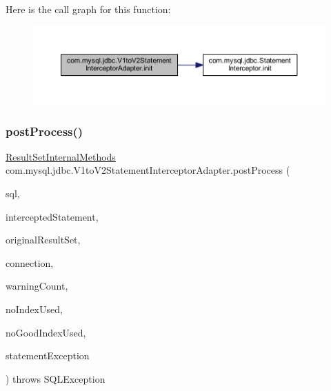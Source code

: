 Here is the call graph for this function\+:
\nopagebreak
\begin{figure}[H]
\begin{center}
\leavevmode
\includegraphics[width=350pt]{classcom_1_1mysql_1_1jdbc_1_1_v1to_v2_statement_interceptor_adapter_acf5784b9b687c7d58d92492e2bd6a800_cgraph}
\end{center}
\end{figure}
\mbox{\label{classcom_1_1mysql_1_1jdbc_1_1_v1to_v2_statement_interceptor_adapter_ab1a3f9ab0d2156eb2fbe442e39354ece}} 
\subsubsection{\texorpdfstring{post\+Process()}{postProcess()}}
{\footnotesize\ttfamily \mbox{\hyperlink{interfacecom_1_1mysql_1_1jdbc_1_1_result_set_internal_methods}{Result\+Set\+Internal\+Methods}} com.\+mysql.\+jdbc.\+V1to\+V2\+Statement\+Interceptor\+Adapter.\+post\+Process (\begin{DoxyParamCaption}\item[{String}]{sql,  }\item[{\mbox{\hyperlink{interfacecom_1_1mysql_1_1jdbc_1_1_statement}{Statement}}}]{intercepted\+Statement,  }\item[{\mbox{\hyperlink{interfacecom_1_1mysql_1_1jdbc_1_1_result_set_internal_methods}{Result\+Set\+Internal\+Methods}}}]{original\+Result\+Set,  }\item[{\mbox{\hyperlink{interfacecom_1_1mysql_1_1jdbc_1_1_connection}{Connection}}}]{connection,  }\item[{int}]{warning\+Count,  }\item[{boolean}]{no\+Index\+Used,  }\item[{boolean}]{no\+Good\+Index\+Used,  }\item[{S\+Q\+L\+Exception}]{statement\+Exception }\end{DoxyParamCaption}) throws S\+Q\+L\+Exception}

